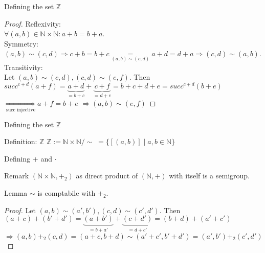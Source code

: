 \documentclass[aspectratio=169]{beamer}
\begin{document}
\begin{frame} {Defining the set $\mathbb{Z}$}
    \begin{proof}
        Reflexivity:\\ $\forall (a, b) \in \mathbb{N} \times \mathbb{N}: a+b = b+a$.\\
        Symmetry:\\ $(a, b) \sim (c, d) \Rightarrow c+b = b+c\underset{(a, b) \sim (c, d)}{=}a+d=d+a \Rightarrow (c, d) \sim (a, b)$.\\
        Transitivity: \\
        Let $(a, b) \sim (c, d), (c, d) \sim (e, f)$. Then \\
        $succ^{c+d}(a+f)= \underbrace{a+d}_{= b+c}+\underbrace{c+f}_{= d+e} = b+c+d+e=succ^{c+d}(b+e)$ \\
        $\underset{\text{succ injective}}{\Rightarrow} a+f=b+e$
        $\Rightarrow (a, b) \sim (e, f)$
    \end{proof}
\end{frame}

\begin{frame} {Defining the set $\mathbb{Z}$}
\begin{block}{Definition: $\mathbb{Z}$}
    $\mathbb{Z} :=  \mathbb{N} \times \mathbb{N} / \sim \;=  \{[(a, b)] \mid a,b \in \mathbb{N}\}$
\end{block}
\end{frame}

\begin{frame}{Defining $+$ and $\cdot$}
    \begin{block} {Remark}
        $(\mathbb{N} \times \mathbb{N}, +_2)$ as direct product of $(\mathbb{N}, +)$ with itself is a semigroup.
    \end{block}

    \begin{block} {Lemma}
        $\sim$ is comptabile with $+_2$.
    \end{block}

    \begin{proof}
        Let $(a, b) \sim (a', b'), (c, d) \sim (c', d')$. Then
        $(a+c) + (b'+d') = \underbrace{(a+b')}_{=b+a'} + \underbrace{(c+d')}_{=d+c'} = (b+d) + (a'+c')$ \\
        $\Rightarrow (a, b) +_2 (c, d) = (a+c, b+d) \sim (a'+c',b'+d') = (a', b') +_2 (c', d')$
    \end{proof}
\end{frame}
\end{document}
